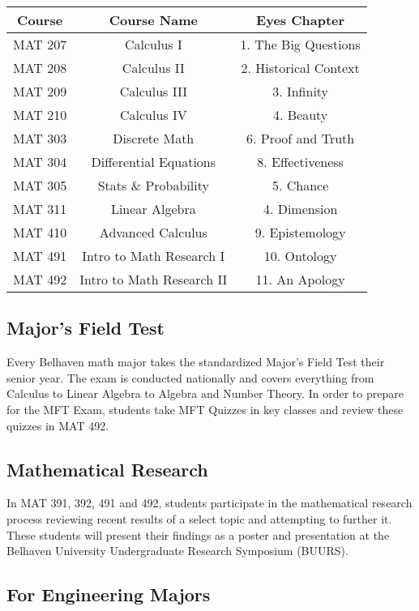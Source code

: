 \begin{center}
\begin{tabular}{ |c|c|c| } 
 \hline
Course & Course Name & Eyes Chapter \\
 \hline
MAT 207 & Calculus I & 1. The Big Questions\\ 
\hline
MAT 208 & Calculus II & 2. Historical Context \\
\hline
MAT 209 & Calculus III & 3. Infinity  \\
\hline
MAT 210 & Calculus IV & 4. Beauty \\
\hline
MAT 303 & Discrete Math & 6. Proof and Truth  \\
\hline
MAT 304 & Differential Equations & 8. Effectiveness \\
\hline
MAT 305 & Stats \& Probability & 5. Chance \\
\hline
MAT 311 & Linear Algebra & 4. Dimension \\
\hline
MAT 410 & Advanced Calculus & 9. Epistemology \\
\hline
MAT 491 & Intro to Math Research I & 10. Ontology \\
\hline
MAT 492 & Intro to Math Research II & 11. An Apology \\
\hline
\end{tabular}
\end{center}

\subsection{Major's Field Test}

Every Belhaven math major takes the standardized Major's Field Test their senior year. The exam is conducted nationally and covers everything from Calculus to Linear Algebra to Algebra and Number Theory. In order to prepare for the MFT Exam, students take MFT Quizzes in key classes and review these quizzes in MAT 492.

\subsection{Mathematical Research}

In MAT 391, 392, 491 and 492, students participate in the mathematical research process reviewing recent results of a select topic and attempting to further it. These students will present their findings as a poster and presentation at the Belhaven University Undergraduate Research Symposium (BUURS).

\subsection{For Engineering Majors}

